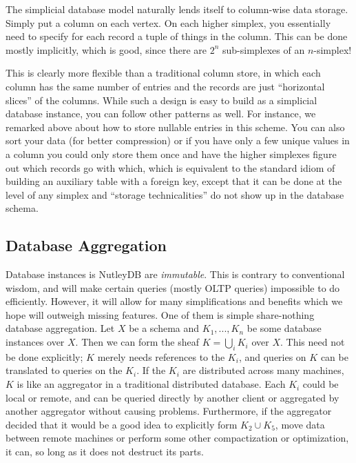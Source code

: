 \documentclass[a4paper,12pt]{article}
\theoremstyle{mydef}
\theoremstyle{myremark}
\begin{document}
The simplicial database model naturally lends itself to column-wise data storage.
Simply put a column on each vertex.  
On each higher simplex, you essentially need to specify for each record a tuple of things in the column.
This can be done mostly implicitly, which is good, since there are $2^n$ sub-simplexes of an $n$-simplex!

This is clearly more flexible than a traditional column store, in which each column has the same number of entries and the records are just ``horizontal slices'' of the columns.
While such a design is easy to build as a simplicial database instance, you can follow other patterns as well.
For instance, we remarked above about how to store nullable entries in this scheme.
You can also sort your data (for better compression) or if you have only a few unique values in a column you could only store them once and have the higher simplexes figure out which records go with which, which is equivalent to the standard idiom of building an auxiliary table with a foreign key, except that it can be done at the level of any simplex and ``storage technicalities'' do not show up in the database schema. 



\subsection{Database Aggregation}

Database instances is NutleyDB are \emph{immutable}.
This is contrary to conventional wisdom, and will make certain queries (mostly OLTP queries) impossible to do efficiently.
However, it will allow for many simplifications and benefits which we hope will outweigh missing features.
One of them is simple share-nothing database aggregation.
Let $X$ be a schema and $K_1,...,K_n$ be some database instances over $X$.
Then we can form the sheaf $K=\bigcup_i K_i$ over $X$.
This need not be done explicitly; $K$ merely needs references to the $K_i$, and queries on $K$ can be translated to queries on the $K_i$.
If the $K_i$ are distributed across many machines, $K$ is like an aggregator in a traditional distributed database.
Each $K_i$ could be local or remote, and can be queried directly by another client or aggregated by another aggregator without causing problems.
Furthermore, if the aggregator decided that it would be a good idea to explicitly form $K_2\cup K_5$, move data between remote machines or perform some other compactization or optimization, it can, so long as it does not destruct its parts.
\end{document}
